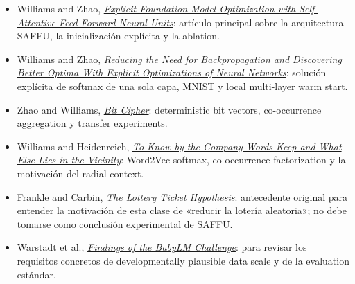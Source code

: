 \documentclass[a4paper]{article}
\begin{document}
\begingroup
\small
\setlength{\itemsep}{2pt}
\begin{itemize}
  \item Williams and Zhao, \href{https://arxiv.org/abs/2311.07510}{\emph{Explicit Foundation Model Optimization with Self-Attentive Feed-Forward Neural Units}}: artículo principal sobre la arquitectura SAFFU, la inicialización explícita y la ablation.
  \item Williams and Zhao, \href{https://arxiv.org/abs/2311.07498}{\emph{Reducing the Need for Backpropagation and Discovering Better Optima With Explicit Optimizations of Neural Networks}}: solución explícita de softmax de una sola capa, MNIST y local multi-layer warm start.
  \item Zhao and Williams, \href{https://arxiv.org/abs/2311.11012}{\emph{Bit Cipher}}: deterministic bit vectors, co-occurrence aggregation y transfer experiments.
  \item Williams and Heidenreich, \href{https://arxiv.org/abs/2205.00148}{\emph{To Know by the Company Words Keep and What Else Lies in the Vicinity}}: Word2Vec softmax, co-occurrence factorization y la motivación del radial context.
  \item Frankle and Carbin, \href{https://arxiv.org/abs/1803.03635}{\emph{The Lottery Ticket Hypothesis}}: antecedente original para entender la motivación de esta clase de «reducir la lotería aleatoria»; no debe tomarse como conclusión experimental de SAFFU.
  \item Warstadt et al., \href{https://arxiv.org/abs/2310.00915}{\emph{Findings of the BabyLM Challenge}}: para revisar los requisitos concretos de developmentally plausible data scale y de la evaluation estándar.
\end{itemize}
\endgroup
\end{document}
